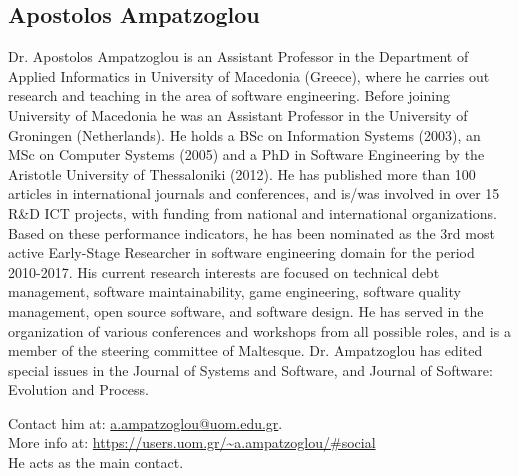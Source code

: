\subsection{Apostolos Ampatzoglou}
Dr. Apostolos Ampatzoglou is an Assistant Professor in the Department of Applied Informatics in University of Macedonia (Greece), where he carries out research and teaching in the area of software engineering. Before joining University of Macedonia he was an Assistant Professor in the University of Groningen (Netherlands). He holds a BSc on Information Systems (2003), an MSc on Computer Systems (2005) and a PhD in Software Engineering by the Aristotle University of Thessaloniki (2012). He has published more than 100 articles in international journals and conferences, and is/was involved in over 15 R&D ICT projects, with funding from national and international organizations. Based on these performance indicators, he has been nominated as the 3rd most active Early-Stage Researcher in software engineering domain for the period 2010-2017. His current research interests are focused on technical debt management, software maintainability, game engineering, software quality management, open source software, and software design. He has served in the organization of various conferences and workshops from all possible roles, and is a member of the steering committee of Maltesque. Dr. Ampatzoglou has edited special issues in the Journal of Systems and Software, and Journal of Software: Evolution and Process.


\medskip
\noindent Contact him at: \href{mailto:a.ampatzoglou@uom.edu.gr}{a.ampatzoglou@uom.edu.gr}.\\
More info at: \url{https://users.uom.gr/~a.ampatzoglou/#social}\\
He acts as the main contact.
